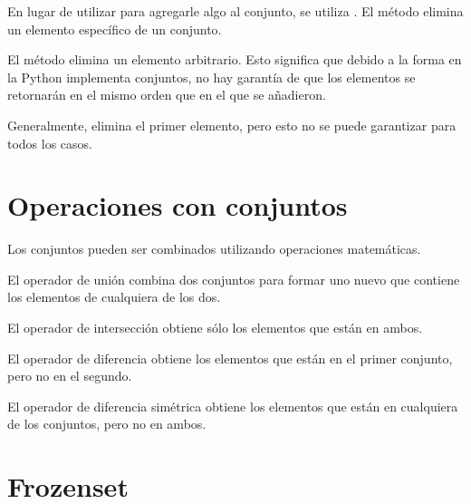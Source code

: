 En lugar de utilizar  para agregarle algo al conjunto, se utiliza . El método  elimina un elemento específico de un conjunto.


El método  elimina un elemento arbitrario. Esto significa que debido a la forma en la Python implementa conjuntos, no hay garantía de que los elementos se retornarán en el mismo orden que en el que se añadieron.\smallskip

Generalmente, elimina el primer elemento, pero esto no se puede garantizar para todos los casos.


\section{Operaciones con conjuntos}

Los conjuntos pueden ser combinados utilizando operaciones matemáticas.\smallskip

El operador de unión \ttt{|} combina dos conjuntos para formar uno nuevo que contiene los elementos de cualquiera de los dos.


El operador de intersección \ttt{\&} obtiene sólo los elementos que están en ambos.


El operador de diferencia \ttt{-} obtiene los elementos que están en el primer conjunto, pero no en el segundo.


El operador de diferencia simétrica \ttt{\^} obtiene los elementos que están en cualquiera de los conjuntos, pero no en ambos.


\section{Frozenset}


